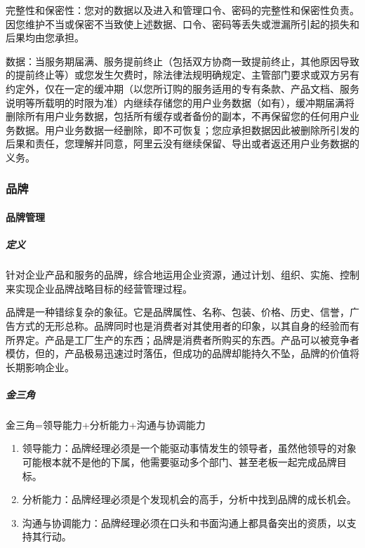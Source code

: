 \documentclass[letterpaper,11pt,english]{sphinxmanual}
\begin{document}
完整性和保密性：您对的数据以及进入和管理口令、密码的完整性和保密性负责。因您维护不当或保密不当致使上述数据、口令、密码等丢失或泄漏所引起的损失和后果均由您承担。

数据：当服务期届满、服务提前终止（包括双方协商一致提前终止，其他原因导致的提前终止等）或您发生欠费时，除法律法规明确规定、主管部门要求或双方另有约定外，仅在一定的缓冲期（以您所订购的服务适用的专有条款、产品文档、服务说明等所载明的时限为准）内继续存储您的用户业务数据（如有），缓冲期届满将删除所有用户业务数据，包括所有缓存或者备份的副本，不再保留您的任何用户业务数据。用户业务数据一经删除，即不可恢复；您应承担数据因此被删除所引发的后果和责任，您理解并同意，阿里云没有继续保留、导出或者返还用户业务数据的义务。


\subsubsection{品牌}
\label{\detokenize{chapter_idea/brand:id1}}\label{\detokenize{chapter_idea/brand::doc}}

\paragraph{品牌管理}
\label{\detokenize{chapter_idea/brand:id2}}

\subparagraph{定义}
\label{\detokenize{chapter_idea/brand:id3}}
针对企业产品和服务的品牌，综合地运用企业资源，通过计划、组织、实施、控制来实现企业品牌战略目标的经营管理过程。

品牌是一种错综复杂的象征。它是品牌属性、名称、包装、价格、历史、信誉，广告方式的无形总称。品牌同时也是消费者对其使用者的印象，以其自身的经验而有所界定。产品是工厂生产的东西；品牌是消费者所购买的东西。产品可以被竞争者模仿，但的，产品极易迅速过时落伍，但成功的品牌却能持久不坠，品牌的价值将长期影响企业。


\subparagraph{金三角}
\label{\detokenize{chapter_idea/brand:id4}}
金三角=领导能力+分析能力+沟通与协调能力
\begin{enumerate}
%
\item {} 
领导能力：品牌经理必须是一个能驱动事情发生的领导者，虽然他领导的对象可能根本就不是他的下属，他需要驱动多个部门、甚至老板一起完成品牌目标。

\item {} 
分析能力：品牌经理必须是个发现机会的高手，分析中找到品牌的成长机会。

\item {} 
沟通与协调能力：品牌经理必须在口头和书面沟通上都具备突出的资质，以支持其行动。

\end{enumerate}
\end{document}
